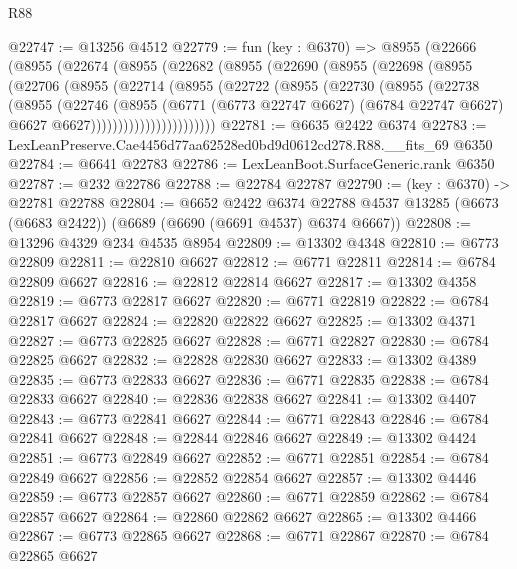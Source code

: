 \begin{lexlean}{R88}
\begin{coremodule}
@22747 := @13256 @4512
@22779 := fun (key : @6370) =>
  @8955
    (@22666
      (@8955
        (@22674
          (@8955
            (@22682
              (@8955
                (@22690
                  (@8955
                    (@22698
                      (@8955
                        (@22706
                          (@8955
                            (@22714
                              (@8955
                                (@22722
                                  (@8955
                                    (@22730
                                      (@8955
                                        (@22738
                                          (@8955
                                            (@22746
                                              (@8955
                                                (@6771
                                                  (@6773 @22747 @6627)
                                                  (@6784 @22747 @6627)
                                                  @6627
                                                  @6627)))))))))))))))))))))))
@22781 := @6635 @2422 @6374
@22783 := LexLeanPreserve.Cae4456d77aa62528ed0bd9d0612cd278.R88.__fits_69 @6350
@22784 := @6641 @22783
@22786 := LexLeanBoot.SurfaceGeneric.rank @6350
@22787 := @232 @22786
@22788 := @22784 @22787
@22790 := (key : @6370) -> @22781 @22788
@22804 := @6652
    @2422
    @6374
    @22788
    @4537
    @13285
    (@6673 (@6683 @2422))
    (@6689 (@6690 (@6691 @4537) @6374 @6667))
@22808 := @13296 @4329 @234 @4535 @8954
@22809 := @13302 @4348
@22810 := @6773 @22809
@22811 := @22810 @6627
@22812 := @6771 @22811
@22814 := @6784 @22809 @6627
@22816 := @22812 @22814 @6627
@22817 := @13302 @4358
@22819 := @6773 @22817 @6627
@22820 := @6771 @22819
@22822 := @6784 @22817 @6627
@22824 := @22820 @22822 @6627
@22825 := @13302 @4371
@22827 := @6773 @22825 @6627
@22828 := @6771 @22827
@22830 := @6784 @22825 @6627
@22832 := @22828 @22830 @6627
@22833 := @13302 @4389
@22835 := @6773 @22833 @6627
@22836 := @6771 @22835
@22838 := @6784 @22833 @6627
@22840 := @22836 @22838 @6627
@22841 := @13302 @4407
@22843 := @6773 @22841 @6627
@22844 := @6771 @22843
@22846 := @6784 @22841 @6627
@22848 := @22844 @22846 @6627
@22849 := @13302 @4424
@22851 := @6773 @22849 @6627
@22852 := @6771 @22851
@22854 := @6784 @22849 @6627
@22856 := @22852 @22854 @6627
@22857 := @13302 @4446
@22859 := @6773 @22857 @6627
@22860 := @6771 @22859
@22862 := @6784 @22857 @6627
@22864 := @22860 @22862 @6627
@22865 := @13302 @4466
@22867 := @6773 @22865 @6627
@22868 := @6771 @22867
@22870 := @6784 @22865 @6627

\end{coremodule}
\end{lexlean}
